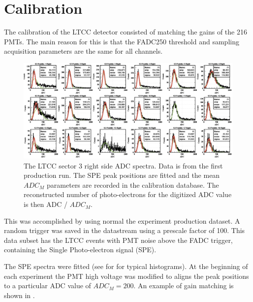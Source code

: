 \section{Calibration}

The calibration of the LTCC detector consisted of matching the gains of the 216 PMTs.
The main reason for this is that the FADC250 threshold and sampling acquisition parameters are the same for all channels.

\begin{figure}[ht]
	\centering
	\includegraphics[width=1.99\columnwidth,keepaspectratio]{img/spe.png}
	\caption{The LTCC sector 3 right side ADC spectra. Data is from the first production run. The SPE peak positions are fitted and the mean $ADC_M$
            parameters are recorded in the calibration database. The reconstructed number of photo-electrons for the digitized ADC value is then ADC / $ADC_M$.}
	\label{fig:speCalibration}
\end{figure}

This was accomplished by using normal the experiment production dataset.
A random trigger was saved in the datastream using a prescale factor of 100.
This data subset has the LTCC events with PMT noise above the FADC trigger, containing the Single Photo-electron signal (SPE).

The SPE spectra were fitted (see for  for typical histograms).
At the beginning of each experiment the PMT high voltage was modified to aligns the peak positions
to a particular ADC value of $ADC_M = 200$. An example of gain matching is shown in .


